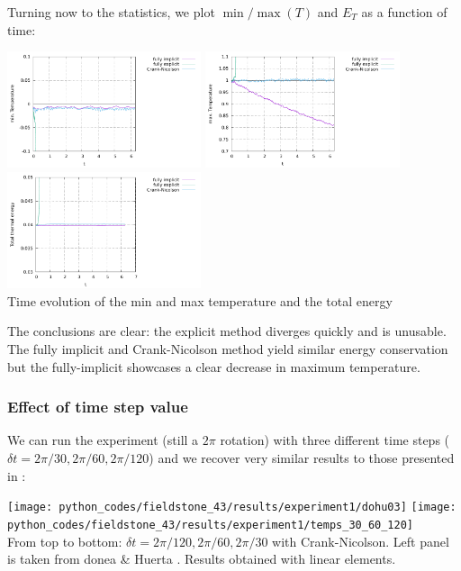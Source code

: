 Turning now to the statistics, we plot $\min/\max(T)$ and $E_T$ as a function of time:
\begin{center}
\includegraphics[width=5.7cm]{python_codes/fieldstone_43/results/experiment1/Tmin.pdf}
\includegraphics[width=5.7cm]{python_codes/fieldstone_43/results/experiment1/Tmax.pdf}
\includegraphics[width=5.7cm]{python_codes/fieldstone_43/results/experiment1/ET.pdf}\\
{\captionfont Time evolution of the min and max temperature and the total energy}
\end{center}
The conclusions are clear: the explicit method diverges quickly and is unusable. 
The fully implicit and Crank-Nicolson 
method yield similar energy conservation but the fully-implicit showcases 
a clear decrease in maximum temperature.


\subsubsection*{Effect of time step value} 
We can run the experiment (still a $2\pi$ rotation) 
with three different time steps ($\delta t=2\pi/30,2\pi/60,2\pi/120$) 
and we recover very similar results to those presented in \textcite{dohu03}:
\begin{center}
\texttt{[image: python\_codes/fieldstone\_43/results/experiment1/dohu03]}
\texttt{[image: python\_codes/fieldstone\_43/results/experiment1/temps\_30\_60\_120]}\\
{\captionfont From top to bottom: $\delta t=2\pi/120,2\pi/60,2\pi/30$ with Crank-Nicolson. 
Left panel is taken from donea \& Huerta \cite{dohu03}. Results obtained with linear elements.}
\end{center}




